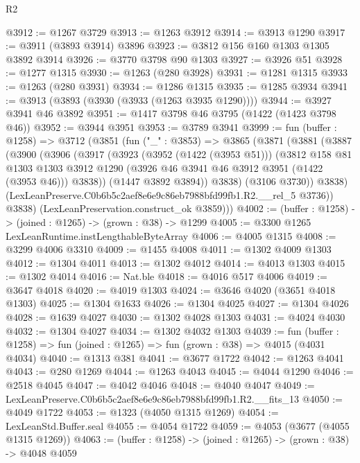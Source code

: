 \begin{lexlean}{R2}
\begin{coremodule}
@3912 := @1267 @3729
@3913 := @1263 @3912
@3914 := @3913 @1290
@3917 := @3911 (@3893 @3914) @3896
@3923 := @3812 @156 @160 @1303 @1305 @3892 @3914
@3926 := @3770 @3798 @90 @1303
@3927 := @3926 @51
@3928 := @1277 @1315
@3930 := @1263 (@280 @3928)
@3931 := @1281 @1315
@3933 := @1263 (@280 @3931)
@3934 := @1286 @1315
@3935 := @1285 @3934
@3941 := @3913 (@3893 (@3930 (@3933 (@1263 @3935 @1290))))
@3944 := @3927 @3941 @46 @3892
@3951 := @1417 @3798 @46 @3795 (@1422 (@1423 @3798 @46))
@3952 := @3944 @3951
@3953 := @3789 @3941
@3999 := fun (buffer : @1258) =>
  @3712
    (@3851
      (fun ("_" : @3853) =>
      @3865
        (@3871
          (@3881
            (@3887
              (@3900
                (@3906
                  (@3917
                    (@3923
                      (@3952 (@1422 (@3953 @51)))
                      (@3812
                        @158
                        @81
                        @1303
                        @1303
                        @3912
                        @1290
                        (@3926 @46 @3941 @46 @3912 @3951 (@1422 (@3953 @46)))
                        @3838))
                    (@1447 @3892 @3894))
                  @3838)
                (@3106 @3730))
              @3838)
            (LexLeanPreserve.C0b6b5c2aef8e6e9c86eb7988bfd99fb1.R2.__rel_5 @3736))
          @3838)
        (LexLeanPreservation.construct_ok @3859)))
@4002 := (buffer : @1258) -> (joined : @1265) -> (grown : @38) -> @1299
@4005 := @3300 @1265 LexLeanRuntime.instLengthableByteArray
@4006 := @4005 @1315
@4008 := @3299 @4006 @3310
@4009 := @1455 @4008
@4011 := @1302 @4009 @1303
@4012 := @1304 @4011
@4013 := @1302 @4012
@4014 := @4013 @1303
@4015 := @1302 @4014
@4016 := Nat.ble
@4018 := @4016 @517 @4006
@4019 := @3647 @4018
@4020 := @4019 @1303
@4024 := @3646 @4020 (@3651 @4018 @1303)
@4025 := @1304 @1633
@4026 := @1304 @4025
@4027 := @1304 @4026
@4028 := @1639 @4027
@4030 := @1302 @4028 @1303
@4031 := @4024 @4030
@4032 := @1304 @4027
@4034 := @1302 @4032 @1303
@4039 := fun (buffer : @1258) => fun (joined : @1265) => fun (grown : @38) => @4015 (@4031 @4034)
@4040 := @1313 @381
@4041 := @3677 @1722
@4042 := @1263 @4041
@4043 := @280 @1269
@4044 := @1263 @4043
@4045 := @4044 @1290
@4046 := @2518 @4045
@4047 := @4042 @4046
@4048 := @4040 @4047
@4049 := LexLeanPreserve.C0b6b5c2aef8e6e9c86eb7988bfd99fb1.R2.__fits_13
@4050 := @4049 @1722
@4053 := @1323 (@4050 @1315 @1269)
@4054 := LexLeanStd.Buffer.seal
@4055 := @4054 @1722
@4059 := @4053 (@3677 (@4055 @1315 @1269))
@4063 := (buffer : @1258) -> (joined : @1265) -> (grown : @38) -> @4048 @4059

\end{coremodule}
\end{lexlean}
